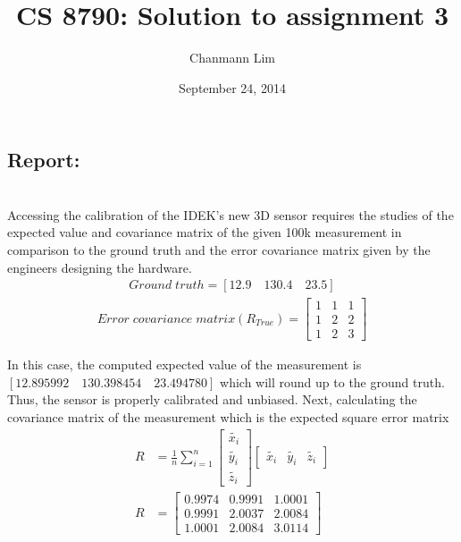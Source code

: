 \documentclass[a4paper]{article}
\begin{document}
\title{CS 8790: Solution to assignment 3}
\author{Chanmann Lim}
\date{September 24, 2014}
\maketitle

\subsection*{Report:} ~\\
\indent Accessing the calibration of the IDEK's new 3D sensor requires the studies of the expected value and covariance matrix of 
the given 100k measurement in comparison to the ground truth and the error covariance matrix given by 
the engineers designing the hardware. \\
\begin{align*}
Ground \; truth = [12.9 \quad 130.4 \quad 23.5]
\end{align*}
\begin{align*}
	Error \; covariance \; matrix (R_{True}) = 
	\begin{bmatrix}
		1 & 1 & 1 \\ 
		1 & 2 & 2 \\
		1 & 2 & 3
	\end{bmatrix}
\end{align*}

In this case, the computed expected value of the measurement is $[12.895992 \quad 130.398454 \quad 23.494780]$ which will 
round up to the ground truth. Thus, the sensor is properly calibrated and unbiased. Next, calculating the covariance matrix 
of the measurement which is the expected square error matrix \\
\begin{align*}
R &=
\frac{1}{n}\sum_{i=1}^{n}
	\begin{bmatrix}
		\widetilde{x_i} \\ 
		\widetilde{y_i} \\
		\widetilde{z_i}
	\end{bmatrix}
	\begin{bmatrix}
		\widetilde{x_i} & \widetilde{y_i} & \widetilde{z_i} 
	\end{bmatrix} \\
R &=
	\begin{bmatrix}
		0.9974  &  0.9991  &  1.0001 \\
    	0.9991  &  2.0037  &  2.0084 \\
    	1.0001  &  2.0084  &  3.0114
	\end{bmatrix}
\end{align*}
\end{document}
